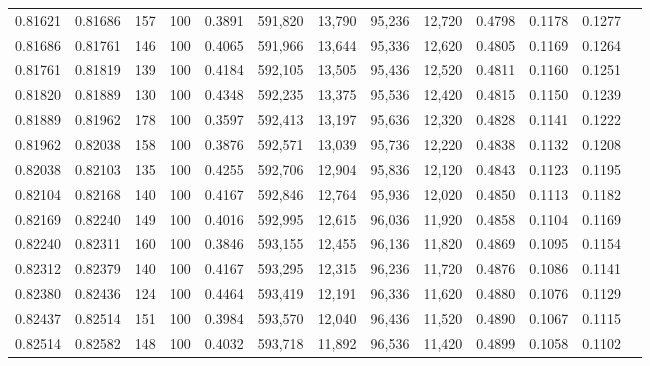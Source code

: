 \begin{tabular}{rrrrrrrrrrrrr}
0.81621 & 0.81686 &   157 & 100 &                                     0.3891 & 591,820 &  13,790 &  95,236 &  12,720 & 0.4798 & 0.1178 & 0.1277 \\
0.81686 & 0.81761 &   146 & 100 &                                     0.4065 & 591,966 &  13,644 &  95,336 &  12,620 & 0.4805 & 0.1169 & 0.1264 \\
0.81761 & 0.81819 &   139 & 100 &                                     0.4184 & 592,105 &  13,505 &  95,436 &  12,520 & 0.4811 & 0.1160 & 0.1251 \\
0.81820 & 0.81889 &   130 & 100 &                                     0.4348 & 592,235 &  13,375 &  95,536 &  12,420 & 0.4815 & 0.1150 & 0.1239 \\
0.81889 & 0.81962 &   178 & 100 &                                     0.3597 & 592,413 &  13,197 &  95,636 &  12,320 & 0.4828 & 0.1141 & 0.1222 \\
0.81962 & 0.82038 &   158 & 100 &                                     0.3876 & 592,571 &  13,039 &  95,736 &  12,220 & 0.4838 & 0.1132 & 0.1208 \\
0.82038 & 0.82103 &   135 & 100 &                                     0.4255 & 592,706 &  12,904 &  95,836 &  12,120 & 0.4843 & 0.1123 & 0.1195 \\
0.82104 & 0.82168 &   140 & 100 &                                     0.4167 & 592,846 &  12,764 &  95,936 &  12,020 & 0.4850 & 0.1113 & 0.1182 \\
0.82169 & 0.82240 &   149 & 100 &                                     0.4016 & 592,995 &  12,615 &  96,036 &  11,920 & 0.4858 & 0.1104 & 0.1169 \\
0.82240 & 0.82311 &   160 & 100 &                                     0.3846 & 593,155 &  12,455 &  96,136 &  11,820 & 0.4869 & 0.1095 & 0.1154 \\
0.82312 & 0.82379 &   140 & 100 &                                     0.4167 & 593,295 &  12,315 &  96,236 &  11,720 & 0.4876 & 0.1086 & 0.1141 \\
0.82380 & 0.82436 &   124 & 100 &                                     0.4464 & 593,419 &  12,191 &  96,336 &  11,620 & 0.4880 & 0.1076 & 0.1129 \\
0.82437 & 0.82514 &   151 & 100 &                                     0.3984 & 593,570 &  12,040 &  96,436 &  11,520 & 0.4890 & 0.1067 & 0.1115 \\
0.82514 & 0.82582 &   148 & 100 &                                     0.4032 & 593,718 &  11,892 &  96,536 &  11,420 & 0.4899 & 0.1058 & 0.1102 \\

\end{tabular}
